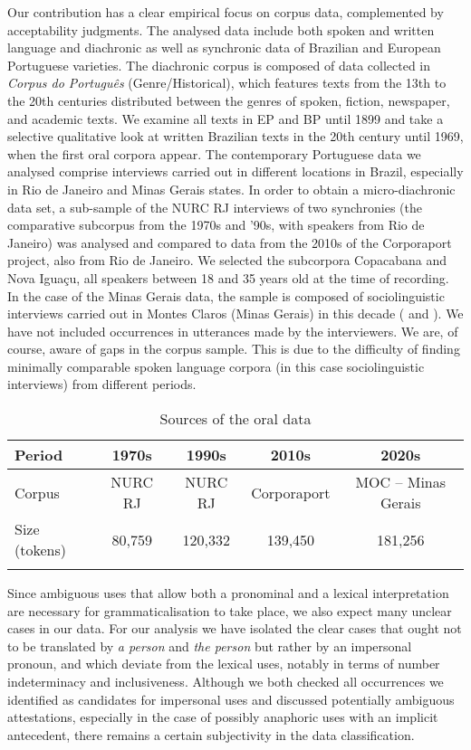 \documentclass[output=paper]{langscibook}
\begin{document}
{Our contribution has a clear empirical focus on corpus data, complemented by acceptability judgments. The analysed data include both spoken and written language and diachronic as well as synchronic data of Brazilian and European Portuguese varieties. The diachronic corpus is composed} {of data collected in} {\textit{Corpus do Português}} (Genre/Historical), which features texts from the 13th to the 20th centuries distributed between the genres of spoken, fiction, newspaper, and academic texts. We examine all texts in EP and BP until 1899 and take a selective qualitative look at written Brazilian texts in the 20th century until 1969, when the first oral corpora appear. The contemporary Portuguese data we analysed comprise interviews carried out in different locations in Brazil, especially in Rio de Janeiro and Minas Gerais states. In order to obtain a micro{}-diachronic data set, a sub-sample of the NURC RJ interviews of two synchronies (the comparative subcorpus from the 1970s and ’90s, with speakers from Rio de Janeiro) was analysed and compared to data from the 2010s of the Corporaport project, also from Rio de Janeiro. We selected the subcorpora Copacabana and Nova Iguaçu, all speakers between 18 and 35 years old at the time of recording. In the case of the Minas Gerais data, the sample is composed of sociolinguistic interviews carried out in Montes Claros (Minas Gerais) in this decade (\citealt{Santos2021} and ). We have not included occurrences in utterances made by the interviewers. We are, of course, aware of gaps in the corpus sample. This is due to the difficulty of finding minimally comparable spoken language corpora (in this case sociolinguistic interviews) from different periods.


\begin{table}
\begin{tabular}{lcccc}
\lsptoprule
Period &  1970s &  1990s &  2010s &  2020s\\
\midrule
Corpus &  NURC RJ &  NURC RJ &  Corporaport &  MOC – Minas Gerais\\
\midrule
Size (tokens) &  80,759 & 120,332 &  139,450 &  181,256\\
\lspbottomrule
\end{tabular}
\caption{Sources of the oral data\label{tab:amaral:2}}
\end{table}

Since ambiguous uses that allow both a pronominal and a lexical interpretation are necessary for grammaticalisation to take place, we also expect many unclear cases in our data. For our analysis we have isolated the clear cases that ought not to be translated by \textit{a person} {and} {\textit{the person}} but rather by an impersonal pronoun, and which deviate from the lexical uses, notably in terms of number indeterminacy and inclusiveness. Although we both checked all occurrences we identified as candidates for impersonal uses and discussed potentially ambiguous attestations, especially in the case of possibly anaphoric uses with an implicit antecedent, there remains a certain subjectivity in the data classification.
\end{document}
